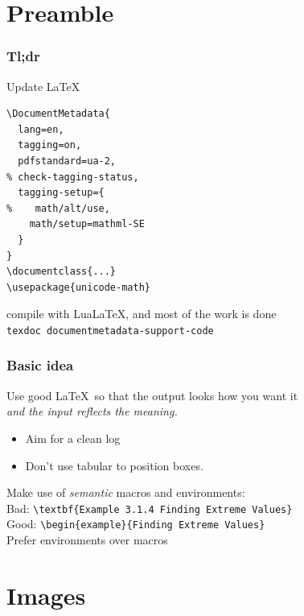 \documentclass{ltx-talk}
\begin{document}
\section{Preamble}

\begin{frame*}
\frametitle{Tl;dr}
Update \LaTeX
\begin{lstlisting}
\DocumentMetadata{
  lang=en,
  tagging=on,
  pdfstandard=ua-2,
% check-tagging-status,
  tagging-setup={
%    math/alt/use,
    math/setup=mathml-SE
  }
}
\documentclass{...}
\usepackage{unicode-math}
\end{lstlisting}
compile with Lua\LaTeX, and most of the work is done\\
\texttt{texdoc documentmetadata-support-code}
\end{frame*}


\begin{frame*}
\frametitle{Basic idea}
Use good \LaTeX\ so that the output looks how you want it\\
\emph{and the input reflects the meaning.}
\begin{itemize}
\item Aim for a clean log
\item Don't use tabular to position boxes.
\end{itemize}
Make use of \emph{semantic} macros and environments:\\
Bad: \verb|\textbf{Example 3.1.4 Finding Extreme Values}|\\
Good: \verb|\begin{example}{Finding Extreme Values}|\\
Prefer environments over macros
\end{frame*}

\section{Images}
\end{document}
